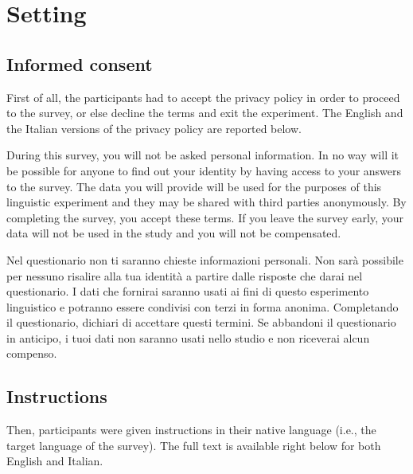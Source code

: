 

\section{Setting} 
 
 \subsection{Informed consent} 
 First of all, the participants had to accept the privacy policy in order to proceed to the survey, or else decline the terms and exit the experiment. The English and the Italian versions of the privacy policy are reported below.

\begin{kaobox}[frametitle=Privacy policy for the English survey]
During this survey, you will not be asked personal information. In no way will it be possible for anyone to find out your identity by having access to your answers to the survey. The data you will provide will be used for the purposes of this linguistic experiment and they may be shared with third parties anonymously. By completing the survey, you accept these terms. If you leave the survey early, your data will not be used in the study and you will not be compensated.
\end{kaobox}

\begin{kaobox}[frametitle=Privacy policy for the Italian survey]
Nel questionario non ti saranno chieste informazioni personali. Non sarà possibile per nessuno risalire alla tua identità a partire dalle risposte che darai nel questionario. I dati che fornirai saranno usati ai fini di questo esperimento linguistico e potranno essere condivisi con terzi in forma anonima. Completando il questionario, dichiari di accettare questi termini. Se abbandoni il questionario in anticipo, i tuoi dati non saranno usati nello studio e non riceverai alcun compenso.
\end{kaobox}

\subsection{Instructions} 
Then, participants were given instructions in their native language (i.e., the target language of the survey). The full text is available right below for both English and Italian.

